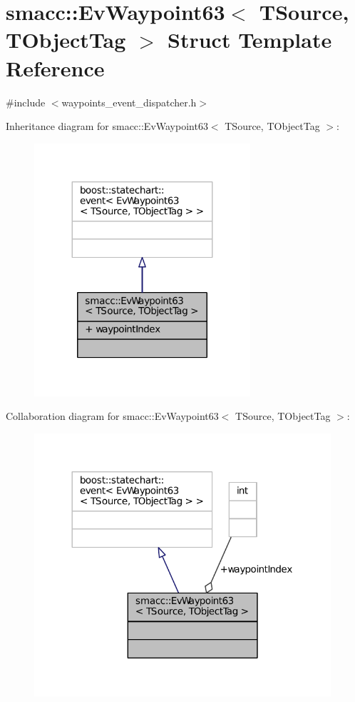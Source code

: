 \hypertarget{structsmacc_1_1EvWaypoint63}{}\section{smacc\+:\+:Ev\+Waypoint63$<$ T\+Source, T\+Object\+Tag $>$ Struct Template Reference}
\label{structsmacc_1_1EvWaypoint63}


{\ttfamily \#include $<$waypoints\+\_\+event\+\_\+dispatcher.\+h$>$}



Inheritance diagram for smacc\+:\+:Ev\+Waypoint63$<$ T\+Source, T\+Object\+Tag $>$\+:
\nopagebreak
\begin{figure}[H]
\begin{center}
\leavevmode
\includegraphics[width=227pt]{structsmacc_1_1EvWaypoint63__inherit__graph}
\end{center}
\end{figure}


Collaboration diagram for smacc\+:\+:Ev\+Waypoint63$<$ T\+Source, T\+Object\+Tag $>$\+:
\nopagebreak
\begin{figure}[H]
\begin{center}
\leavevmode
\includegraphics[width=312pt]{structsmacc_1_1EvWaypoint63__coll__graph}
\end{center}
\end{figure}
